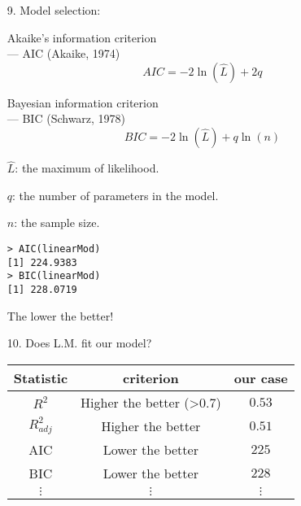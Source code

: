 \begin{frame}[fragile]

	\begin{enumerate}
		\item[9.] Model selection:\\[2em]
		\item[]
			\begin{minipage}{0.45\textwidth}
\centering
 Akaike's information criterion \\
  --- AIC (Akaike, 1974)
		\[
			AIC = -2 \ln(\widehat{L}) +2 q
		\]
			\end{minipage}
			\begin{minipage}{0.45\textwidth}
Bayesian information criterion\\
--- BIC (Schwarz, 1978)
			\[
				BIC = -2 \ln(\widehat{L}) + q \ln(n)
			\]
			\end{minipage}
			\vfill
		\item[] $\widehat{L}$: the maximum of likelihood.
		\item[] $q$: the number of parameters in the model.
		\item[] $n$: the sample size.
			\vfill
		\item[]
			\begin{center}
				\begin{minipage}{0.3\textwidth}
\begin{lstlisting}
> AIC(linearMod)
[1] 224.9383
> BIC(linearMod)
[1] 228.0719
\end{lstlisting}
				\end{minipage}
				\vfill
		The lower the better!
			\end{center}
	\end{enumerate}
\end{frame}
\begin{frame}

	\begin{enumerate}
		\item[10.] Does L.M. fit our model?
			\vfill
			\renewcommand{\arraystretch}{1.6}
			\begin{center}
				\begin{tabular}{ccc}
\hline
Statistic & criterion & our case\\
\hline
$R^2$ & Higher the better (>0.7) & $0.53$\\
$R^2_{adj}$ & Higher the better & $0.51$ \\
AIC & Lower the better & $225$\\
BIC & Lower the better & $228$\\
$\vdots$ & $\vdots$ & $\vdots$\\
\hline
				\end{tabular}
			\end{center}
	\end{enumerate}
\end{frame}
